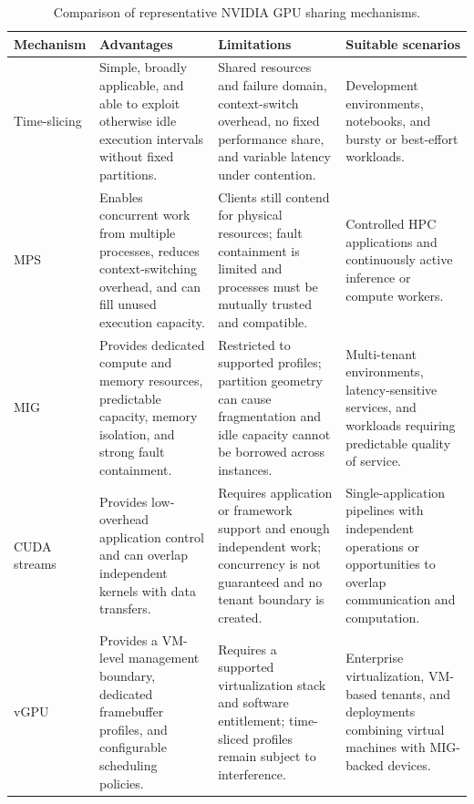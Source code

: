 \begin{table}[!p]
    \centering
    \small
    \caption{Comparison of representative NVIDIA GPU sharing mechanisms.}
    \label{tab:gpu-sharing-comparison}
    \begin{tabularx}{\textwidth}{p{}X X X}
        \toprule
        \textbf{Mechanism} & \textbf{Advantages} & \textbf{Limitations} & \textbf{Suitable scenarios} \\
        \midrule
        Time-slicing & Simple, broadly applicable, and able to exploit otherwise idle execution intervals without fixed partitions. & Shared resources and failure domain, context-switch overhead, no fixed performance share, and variable latency under contention. & Development environments, notebooks, and bursty or best-effort workloads. \\
        MPS & Enables concurrent work from multiple processes, reduces context-switching overhead, and can fill unused execution capacity. & Clients still contend for physical resources; fault containment is limited and processes must be mutually trusted and compatible. & Controlled HPC applications and continuously active inference or compute workers. \\
        MIG & Provides dedicated compute and memory resources, predictable capacity, memory isolation, and strong fault containment. & Restricted to supported profiles; partition geometry can cause fragmentation and idle capacity cannot be borrowed across instances. & Multi-tenant environments, latency-sensitive services, and workloads requiring predictable quality of service. \\
        CUDA streams & Provides low-overhead application control and can overlap independent kernels with data transfers. & Requires application or framework support and enough independent work; concurrency is not guaranteed and no tenant boundary is created. & Single-application pipelines with independent operations or opportunities to overlap communication and computation. \\
        vGPU & Provides a VM-level management boundary, dedicated framebuffer profiles, and configurable scheduling policies. & Requires a supported virtualization stack and software entitlement; time-sliced profiles remain subject to interference. & Enterprise virtualization, VM-based tenants, and deployments combining virtual machines with MIG-backed devices. \\
        \bottomrule
    \end{tabularx}
\end{table}

